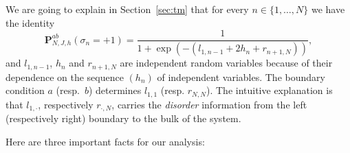 \documentclass[10pt]{amsart}
\theoremstyle{definition}\newtheorem{defi}[theo]{Definition}\newtheorem{rema}[theo]{Remark}\newtheorem{exam}[theo]{Example}\newtheorem{exem}[theo]{Example}\newtheorem{nota}[theo]{Notation}
\newcommand{\bP}{\mathbf{P}}
\newcommand{\gs}{\sigma}
\begin{document}
We are going to explain in Section~\ref{sec:tm} that for every $n\in \{1, \dots, N\}$ we have the identity
\begin{equation}\label{eq:Psigma0.0}
\bP^{ab}_{ N, J, h}\left(\gs_n=+1\right)=
\frac 1 {1+ \exp\left(-\left(l_{1, n-1} +2h_n+ r_{n+1,N}\right)\right)},
\end{equation}
and $l_{1, n-1}$, $h_n$ and $r_{n+1, N}$ are independent random variables because of their dependence on the sequence $(h_n)$ of independent variables. The boundary condition $a$ (resp.~$b$) determines $l_{1,1}$ (resp. $r_{N,N}$). The intuitive explanation is that $l_{1, \cdot}$, respectively $r_{\cdot, N}$, carries the \emph{disorder} information from the left (respectively right) boundary to the bulk of the system.



Here are three important facts for our analysis:
\end{document}

